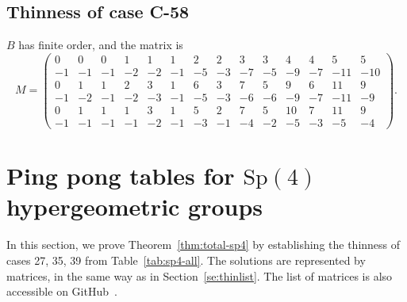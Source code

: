 \documentclass[11pt,a4paper]{amsart}
\theoremstyle{definition}
\theoremstyle{definition}
\numberwithin{equation}{section}
\newcommand{\Sp}{\mathrm{Sp}}
\begin{document}



\subsection{Thinness of case C-58}
$B$ has finite order, and the matrix is
$$M=\left(\begin{array}{rrrrrrrrrrrrrr}
0 & 0 & 0 & 1 & 1 & 1 & 2 & 2 & 3 & 3 & 4 & 4 & 5 & 5 \\
-1 & -1 & -1 & -2 & -2 & -1 & -5 & -3 & -7 & -5 & -9 & -7 & -11 & -10 \\
0 & 1 & 1 & 2 & 3 & 1 & 6 & 3 & 7 & 5 & 9 & 6 & 11 & 9 \\
-1 & -2 & -1 & -2 & -3 & -1 & -5 & -3 & -6 & -6 & -9 & -7 & -11 & -9 \\
0 & 1 & 1 & 1 & 3 & 1 & 5 & 2 & 7 & 5 & 10 & 7 & 11 & 9 \\
-1 & -1 & -1 & -1 & -2 & -1 & -3 & -1 & -4 & -2 & -5 & -3 & -5 & -4
\end{array}\right). $$


\section{Ping pong tables for \texorpdfstring{$\Sp(4)$}{Sp(4)} hypergeometric groups}\label{se:thinsp4}

In this section, we prove Theorem~\ref{thm:total-sp4} by establishing the thinness of cases 27, 35, 39 from Table~\ref{tab:sp4-all}. The solutions are represented by matrices, in the same way as in Section~\ref{se:thinlist}. The list of matrices is also accessible on GitHub~\cite{BDN21-s}.
\end{document}
